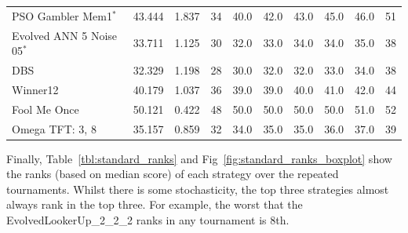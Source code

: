 \documentclass[10pt,letterpaper]{article}
\begin{document}
\begin{table}[!hbtp]
\begin{tabular}{lrrrrrrrrr}
PSO Gambler Mem1$^{*}$        &  43.444 &  1.837 &   34 &  40.0 &  42.0 &  43.0 &  45.0 &  46.0 &   51 \\
Evolved ANN 5 Noise 05$^{*}$  &  33.711 &  1.125 &   30 &  32.0 &  33.0 &  34.0 &  34.0 &  35.0 &   38 \\
DBS                           &  32.329 &  1.198 &   28 &  30.0 &  32.0 &  32.0 &  33.0 &  34.0 &   38 \\
Winner12                      &  40.179 &  1.037 &   36 &  39.0 &  39.0 &  40.0 &  41.0 &  42.0 &   44 \\
Fool Me Once                  &  50.121 &  0.422 &   48 &  50.0 &  50.0 &  50.0 &  50.0 &  51.0 &   52 \\
Omega TFT: 3, 8               &  35.157 &  0.859 &   32 &  34.0 &  35.0 &  35.0 &  36.0 &  37.0 &   39 \\
\bottomrule
\end{tabular}
\end{table}


Finally, Table~\ref{tbl:standard_ranks} and
Fig~\ref{fig:standard_ranks_boxplot} show the ranks (based on median score)
of each strategy over the repeated tournaments. Whilst there is some
stochasticity, the top three strategies almost always rank in the top three. For
example, the worst that the EvolvedLookerUp\_2\_2\_2 ranks in any tournament
is 8th.
\end{document}
